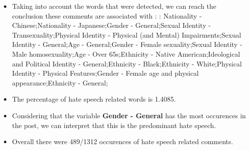 \documentclass[11pt]{article}
\begin{document}
\begin{itemize}\item Taking into account the words that were detected, we can reach the conclusion these comments are associated with : : Nationality - Chinese;Nationality - Japanese;Gender - General;Sexual Identity - Transexuality;Physical Identity - Physical (and Mental) Impairments;Sexual Identity - General;Age - General;Gender - Female sexuality;Sexual Identity - Male homosexuality;Age - Over 65s;Ethnicity - Native American;Ideological and Political Identity - General;Ethnicity - Black;Ethnicity - White;Physical Identity - Physical Features;Gender - Female age and physical appearance;Ethnicity - General;%

\item The percentage of hate speech related words is 1.4085.

\item Considering that the variable \textbf{Gender - General} has the most occurences in the post, we can interpret that this is the predominant hate speech.

\item Overall there were 489/1312 occurences of hate speech related comments.\end{itemize}
\end{document}
